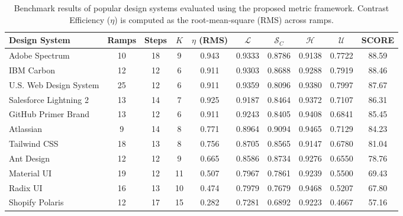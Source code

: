 \begin{table}[t]
\centering
\caption{Benchmark results of popular design systems evaluated using the proposed metric framework. Contrast Efficiency ($\eta$) is computed as the root-mean-square (RMS) across ramps.}
\label{tab:benchmark}
\small
\begin{tabular}{lccccccccc}
\hline
Design System & Ramps & Steps & $K$ & $\eta$ (RMS) & $\mathcal{L}$ & $\mathcal{S}_C$ & $\mathcal{H}$ & $\mathcal{U}$ & SCORE \\
\hline
Adobe Spectrum & 10 & 18 & 9  & 0.943 & 0.9333 & 0.8786 & 0.9138 & 0.7722 & 88.59 \\
IBM Carbon & 12 & 12 & 6  & 0.911 & 0.9303 & 0.8688 & 0.9288 & 0.7919 & 88.46 \\
U.S. Web Design System & 25 & 12 & 6 & 0.911 & 0.9359 & 0.8096 & 0.9380 & 0.7997 & 87.67 \\
Salesforce Lightning 2 & 13 & 14 & 7 & 0.925 & 0.9187 & 0.8464 & 0.9372 & 0.7107 & 86.31 \\
GitHub Primer Brand & 13 & 12 & 6 & 0.911 & 0.9243 & 0.8405 & 0.9408 & 0.6841 & 85.45 \\
Atlassian & 9 & 14 & 8 & 0.771 & 0.8964 & 0.9094 & 0.9465 & 0.7129 & 84.23 \\
Tailwind CSS & 18 & 13 & 8 & 0.756 & 0.8705 & 0.8565 & 0.9147 & 0.6780 & 81.04 \\
Ant Design & 12 & 12 & 9 & 0.665 & 0.8586 & 0.8734 & 0.9276 & 0.6550 & 78.76 \\
Material UI & 19 & 12 & 11 & 0.507 & 0.7967 & 0.7861 & 0.9239 & 0.5500 & 69.43 \\
Radix UI & 16 & 13 & 10 & 0.474 & 0.7979 & 0.7679 & 0.9468 & 0.5207 & 67.80 \\
Shopify Polaris & 12 & 17 & 15 & 0.282 & 0.7281 & 0.6892 & 0.9223 & 0.4667 & 57.16 \\
\hline
\end{tabular}
\end{table}